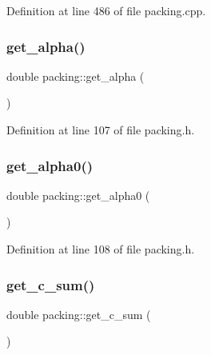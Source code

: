 Definition at line 486 of file packing.\+cpp.

\mbox{\label{classpacking_a366b4efa1f1fecf098df6bb9af09e739}} 
\subsubsection{\texorpdfstring{get\+\_\+alpha()}{get\_alpha()}}
{\footnotesize\ttfamily double packing\+::get\+\_\+alpha (\begin{DoxyParamCaption}{ }\end{DoxyParamCaption})\hspace{0.3cm}{\ttfamily [inline]}}



Definition at line 107 of file packing.\+h.

\mbox{\label{classpacking_a357aeeeac709d7926cbbaa9312cf3649}} 
\subsubsection{\texorpdfstring{get\+\_\+alpha0()}{get\_alpha0()}}
{\footnotesize\ttfamily double packing\+::get\+\_\+alpha0 (\begin{DoxyParamCaption}{ }\end{DoxyParamCaption})\hspace{0.3cm}{\ttfamily [inline]}}



Definition at line 108 of file packing.\+h.

\mbox{\label{classpacking_a23fc5018721f5022318addbe87b33d47}} 
\subsubsection{\texorpdfstring{get\+\_\+c\+\_\+sum()}{get\_c\_sum()}}
{\footnotesize\ttfamily double packing\+::get\+\_\+c\+\_\+sum (\begin{DoxyParamCaption}{ }\end{DoxyParamCaption})}



